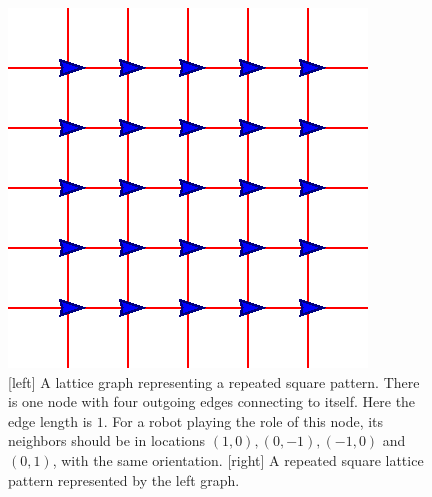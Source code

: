 \begin{figure}
  \centering
  
  \label{fig:edgetrans}
\end{figure}

\begin{figure}
    \centering
    \begin{minipage}[b]{0.45\linewidth}
        \centering
        
    \end{minipage}
    \begin{minipage}[b]{0.45\linewidth}
        \centering
        \includegraphics[trim=0.5cm 0.5cm 0.5cm 0.5cm, clip=true]{figs/sq-lat}
    \end{minipage}
    \caption{[left] A lattice graph representing a repeated square
    pattern. There is one node with four outgoing edges connecting to
    itself. Here the edge length is $1$. For a robot playing the role
    of this node, its neighbors should be in locations $(1, 0), (0,
    -1), (-1, 0)$ and $(0, 1)$, with the same orientation. [right]
    A repeated square lattice pattern represented by the left
    graph.}
    \label{fig:sq}
\end{figure}
